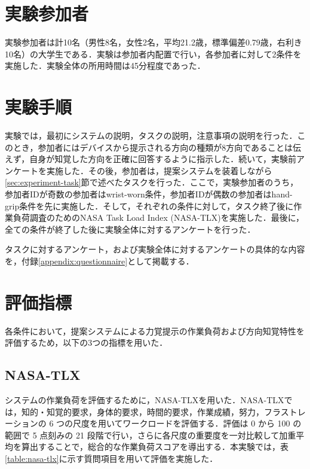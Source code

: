 \documentclass[a4paper,11pt]{jreport}
\begin{document}
\section{実験参加者}
実験参加者は計10名（男性8名，女性2名，平均21.2歳，標準偏差0.79歳，右利き10名）の大学生である．実験は参加者内配置で行い，各参加者に対して2条件を実施した．実験全体の所用時間は45分程度であった．

\section{実験手順}
実験では，最初にシステムの説明，タスクの説明，注意事項の説明を行った．このとき，参加者にはデバイスから提示される方向の種類が8方向であることは伝えず，自身が知覚した方向を正確に回答するように指示した．続いて，実験前アンケートを実施した．その後，参加者は，提案システムを装着しながら\ref{sec:experiment-task}節で述べたタスクを行った．ここで，実験参加者のうち，参加者IDが奇数の参加者はwrist-worn条件，参加者IDが偶数の参加者はhand-grip条件を先に実施した．そして，それぞれの条件に対して，タスク終了後に作業負荷調査のためのNASA Task Load Index (NASA-TLX)\cite{nasa-tlx}を実施した．最後に，全ての条件が終了した後に実験全体に対するアンケートを行った．

タスクに対するアンケート，および実験全体に対するアンケートの具体的な内容を，付録\ref{appendix:questionnaire}として掲載する．

\section{評価指標}
各条件において，提案システムによる力覚提示の作業負荷および方向知覚特性を評価するため，以下の3つの指標を用いた．
\subsection{NASA-TLX}
システムの作業負荷を評価するために，NASA-TLXを用いた．NASA-TLXでは，知的・知覚的要求，身体的要求，時間的要求，作業成績，努力，フラストレーションの 6 つの尺度を用いてワークロードを評価する．評価は 0 から 100 の範囲で 5 点刻みの 21 段階で行い，さらに各尺度の重要度を一対比較して加重平均を算出することで，総合的な作業負荷スコアを導出する．本実験では，表\ref{table:nasa-tlx}に示す質問項目を用いて評価を実施した．
\end{document}

